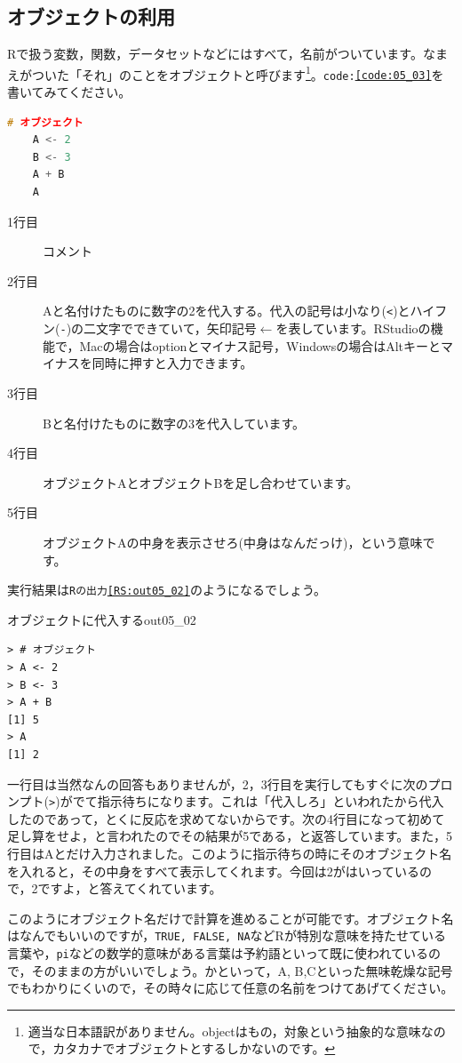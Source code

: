 \documentclass{ltjsbook}
\begin{document}
\subsection{オブジェクトの利用}
Rで扱う変数，関数，データセットなどにはすべて，名前がついています。なまえがついた「それ」のことをオブジェクトと呼びます\footnote{適当な日本語訳がありません。objectはもの，対象という抽象的な意味なので，カタカナでオブジェクトとするしかないのです。}。\texttt{code:\ref{code:05_03}}を書いてみてください。
\begin{lstlisting}[language=c++,label={code:05_03},caption={オブジェクトに代入}]
	# オブジェクト
	A <- 2
	B <- 3
	A + B
	A
\end{lstlisting}
\begin{description}
	\item[1行目] コメント
	\item[2行目] Aと名付けたものに数字の2を代入する。代入の記号は小なり(\verb|<|)とハイフン(\verb|-|)の二文字でできていて，矢印記号$\leftarrow$を表しています。RStudioの機能で，Macの場合はoptionとマイナス記号，Windowsの場合はAltキーとマイナスを同時に押すと入力できます。
	\item[3行目] Bと名付けたものに数字の3を代入しています。
	\item[4行目] オブジェクトAとオブジェクトBを足し合わせています。
	\item[5行目] オブジェクトAの中身を表示させろ(中身はなんだっけ)，という意味です。
\end{description}

実行結果は\texttt{Rの出力\ref{RS:out05_02}}のようになるでしょう。
\begin{Rscreen}{オブジェクトに代入する}{out05_02}
	\begin{verbatim}
> # オブジェクト
> A <- 2
> B <- 3
> A + B
[1] 5
> A 
[1] 2
\end{verbatim}
\end{Rscreen}
一行目は当然なんの回答もありませんが，2，3行目を実行してもすぐに次のプロンプト(\verb|>|)がでて指示待ちになります。これは「代入しろ」といわれたから代入したのであって，とくに反応を求めてないからです。次の4行目になって初めて足し算をせよ，と言われたのでその結果が5である，と返答しています。また，5行目はAとだけ入力されました。このように指示待ちの時にそのオブジェクト名を入れると，その中身をすべて表示してくれます。今回は2がはいっているので，2ですよ，と答えてくれています。

このようにオブジェクト名だけで計算を進めることが可能です。オブジェクト名はなんでもいいのですが，\texttt{TRUE, FALSE, NA}などRが特別な意味を持たせている言葉や，\texttt{pi}などの数学的意味がある言葉は予約語といって既に使われているので，そのままの方がいいでしょう。かといって，A, B,Cといった無味乾燥な記号でもわかりにくいので，その時々に応じて任意の名前をつけてあげてください。
\end{document}
